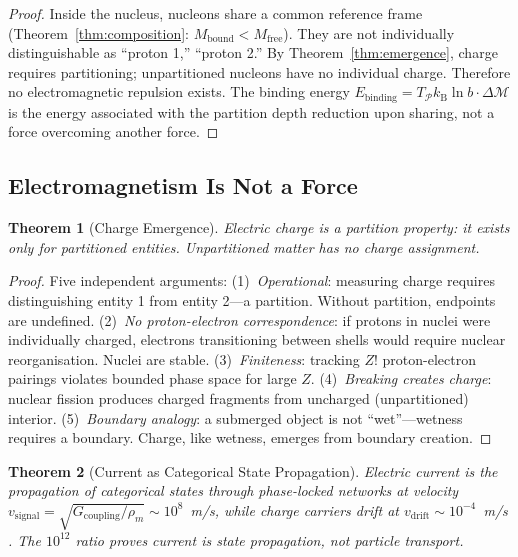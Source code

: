 \documentclass[11pt,twocolumn,a4paper]{article}
\newtheorem{theorem}{Theorem}[section]
\theoremstyle{definition}
\theoremstyle{remark}
\newcommand{\kB}{k_{\mathrm{B}}}
\newcommand{\Depth}{\mathcal{M}}
\newcommand{\Mfree}{M_{\mathrm{free}}}
\newcommand{\Mbound}{M_{\mathrm{bound}}}
\begin{document}
\begin{proof}
Inside the nucleus, nucleons share a common reference frame (Theorem~\ref{thm:composition}: $\Mbound < \Mfree$). They are not individually distinguishable as ``proton 1,'' ``proton 2.'' By Theorem~\ref{thm:emergence}, charge requires partitioning; unpartitioned nucleons have no individual charge. Therefore no electromagnetic repulsion exists. The binding energy $E_{\mathrm{binding}} = T_{\mathcal{P}}\kB\ln b \cdot \Delta\Depth$ is the energy associated with the partition depth reduction upon sharing, not a force overcoming another force.
\end{proof}

\subsection{Electromagnetism Is Not a Force}

\begin{theorem}[Charge Emergence]
\label{thm:charge}
Electric charge is a partition property: it exists only for partitioned entities. Unpartitioned matter has no charge assignment.
\end{theorem}

\begin{proof}
Five independent arguments: (1)~\emph{Operational}: measuring charge requires distinguishing entity 1 from entity 2---a partition. Without partition, endpoints are undefined. (2)~\emph{No proton-electron correspondence}: if protons in nuclei were individually charged, electrons transitioning between shells would require nuclear reorganisation. Nuclei are stable. (3)~\emph{Finiteness}: tracking $Z!$ proton-electron pairings violates bounded phase space for large $Z$. (4)~\emph{Breaking creates charge}: nuclear fission produces charged fragments from uncharged (unpartitioned) interior. (5)~\emph{Boundary analogy}: a submerged object is not ``wet''---wetness requires a boundary. Charge, like wetness, emerges from boundary creation.
\end{proof}

\begin{theorem}[Current as Categorical State Propagation]
\label{thm:current}
Electric current is the propagation of categorical states through phase-locked networks at velocity $v_{\mathrm{signal}} = \sqrt{G_{\mathrm{coupling}}/\rho_m} \sim 10^8$~m/s, while charge carriers drift at $v_{\mathrm{drift}} \sim 10^{-4}$~m/s \citep{drude1900, ashcroft1976}. The $10^{12}$ ratio proves current is state propagation, not particle transport.
\end{theorem}
\end{document}
